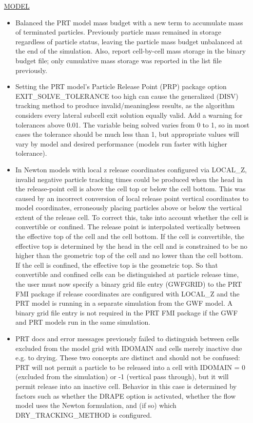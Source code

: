 \underline{MODEL}
\begin{itemize}
\item Balanced the PRT model mass budget with a new term to accumulate mass of terminated particles. Previously particle mass remained in storage regardless of particle status, leaving the particle mass budget unbalanced at the end of the simulation. Also, report cell-by-cell mass storage in the binary budget file; only cumulative mass storage was reported in the list file previously.
\item Setting the PRT model's Particle Release Point (PRP) package option EXIT\_SOLVE\_TOLERANCE too high can cause the generalized (DISV) tracking method to produce invalid/meaningless results, as the algorithm considers every lateral subcell exit solution equally valid. Add a warning for tolerances above 0.01. The variable being solved varies from 0 to 1, so in most cases the tolerance should be much less than 1, but appropriate values will vary by model and desired performance (models run faster with higher tolerance).
\item In Newton models with local z release coordinates configured via LOCAL\_Z, invalid negative particle tracking times could be produced when the head in the release-point cell is above the cell top or below the cell bottom. This was caused by an incorrect conversion of local release point vertical coordinates to model coordinates, erroneously placing particles above or below the vertical extent of the release cell. To correct this, take into account whether the cell is convertible or confined. The release point is interpolated vertically between the effective top of the cell and the cell bottom. If the cell is convertible, the effective top is determined by the head in the cell and is constrained to be no higher than the geometric top of the cell and no lower than the cell bottom. If the cell is confined, the effective top is the geometric top. So that convertible and confined cells can be distinguished at particle release time, the user must now specify a binary grid file entry (GWFGRID) to the PRT FMI package if release coordinates are configured with LOCAL\_Z and the PRT model is running in a separate simulation from the GWF model. A binary grid file entry is not required in the PRT FMI package if the GWF and PRT models run in the same simulation.
\item PRT docs and error messages previously failed to distinguish between cells excluded from the model grid with IDOMAIN and cells merely inactive due e.g. to drying. These two concepts are distinct and should not be confused: PRT will not permit a particle to be released into a cell with IDOMAIN = 0 (excluded from the simulation) or -1 (vertical pass through), but it will permit release into an inactive cell. Behavior in this case is determined by factors such as whether the DRAPE option is activated, whether the flow model uses the Newton formulation, and (if so) which DRY\_TRACKING\_METHOD is configured.

\end{itemize}
